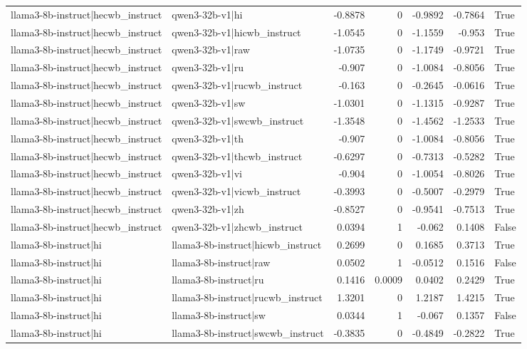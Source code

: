 \begin{table}
\begin{tabular}{l l r r r r l}
llama3-8b-instruct|hecwb_instruct & qwen3-32b-v1|hi & -0.8878 & 0 & -0.9892 & -0.7864 & True \\
llama3-8b-instruct|hecwb_instruct & qwen3-32b-v1|hicwb_instruct & -1.0545 & 0 & -1.1559 & -0.953 & True \\
llama3-8b-instruct|hecwb_instruct & qwen3-32b-v1|raw & -1.0735 & 0 & -1.1749 & -0.9721 & True \\
llama3-8b-instruct|hecwb_instruct & qwen3-32b-v1|ru & -0.907 & 0 & -1.0084 & -0.8056 & True \\
llama3-8b-instruct|hecwb_instruct & qwen3-32b-v1|rucwb_instruct & -0.163 & 0 & -0.2645 & -0.0616 & True \\
llama3-8b-instruct|hecwb_instruct & qwen3-32b-v1|sw & -1.0301 & 0 & -1.1315 & -0.9287 & True \\
llama3-8b-instruct|hecwb_instruct & qwen3-32b-v1|swcwb_instruct & -1.3548 & 0 & -1.4562 & -1.2533 & True \\
llama3-8b-instruct|hecwb_instruct & qwen3-32b-v1|th & -0.907 & 0 & -1.0084 & -0.8056 & True \\
llama3-8b-instruct|hecwb_instruct & qwen3-32b-v1|thcwb_instruct & -0.6297 & 0 & -0.7313 & -0.5282 & True \\
llama3-8b-instruct|hecwb_instruct & qwen3-32b-v1|vi & -0.904 & 0 & -1.0054 & -0.8026 & True \\
llama3-8b-instruct|hecwb_instruct & qwen3-32b-v1|vicwb_instruct & -0.3993 & 0 & -0.5007 & -0.2979 & True \\
llama3-8b-instruct|hecwb_instruct & qwen3-32b-v1|zh & -0.8527 & 0 & -0.9541 & -0.7513 & True \\
llama3-8b-instruct|hecwb_instruct & qwen3-32b-v1|zhcwb_instruct & 0.0394 & 1 & -0.062 & 0.1408 & False \\
llama3-8b-instruct|hi & llama3-8b-instruct|hicwb_instruct & 0.2699 & 0 & 0.1685 & 0.3713 & True \\
llama3-8b-instruct|hi & llama3-8b-instruct|raw & 0.0502 & 1 & -0.0512 & 0.1516 & False \\
llama3-8b-instruct|hi & llama3-8b-instruct|ru & 0.1416 & 0.0009 & 0.0402 & 0.2429 & True \\
llama3-8b-instruct|hi & llama3-8b-instruct|rucwb_instruct & 1.3201 & 0 & 1.2187 & 1.4215 & True \\
llama3-8b-instruct|hi & llama3-8b-instruct|sw & 0.0344 & 1 & -0.067 & 0.1357 & False \\
llama3-8b-instruct|hi & llama3-8b-instruct|swcwb_instruct & -0.3835 & 0 & -0.4849 & -0.2822 & True \\

\end{tabular}
\end{table}
